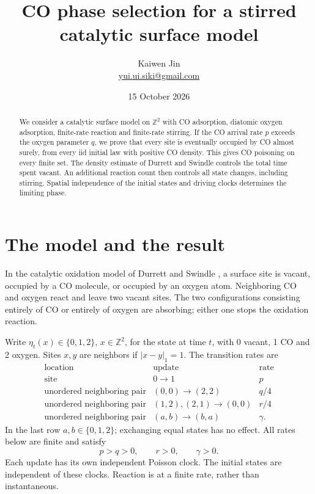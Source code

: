\documentclass[11pt,a4paper]{article}
\title{CO phase selection for a stirred catalytic surface model}
\author{Kaiwen Jin\\[3pt]
  \small\href{mailto:yui.ui.siki@gmail.com}{yui.ui.siki@gmail.com}}
\date{15 October 2026}
\newcommand{\Z}{\mathbb Z}
\begin{document}
\maketitle

\begin{abstract}
We consider a catalytic surface model on \(\Z^2\) with CO adsorption,
diatomic oxygen adsorption, finite-rate reaction and finite-rate stirring.
If the CO arrival rate \(p\) exceeds the oxygen parameter \(q\), we prove
that every site is eventually occupied by CO almost surely, from every
iid initial law with positive CO density. This gives CO poisoning on
every finite set. The density estimate of Durrett and Swindle controls
the total time spent vacant. An additional reaction count then controls
all state changes, including stirring. Spatial independence of the
initial states and driving clocks determines the limiting phase.
\end{abstract}

\section{The model and the result}

In the catalytic oxidation model of Durrett and Swindle \cite{DS}, a
surface site is vacant, occupied by a CO molecule, or occupied by an
oxygen atom. Neighboring CO and oxygen react and leave two vacant sites.
The two configurations consisting entirely of CO or entirely of oxygen
are absorbing; either one stops the oxidation reaction.

Write \(\eta_t(x)\in\{0,1,2\}\), \(x\in\Z^2\), for the state at time \(t\),
with 0 vacant, 1 CO and 2 oxygen. Sites \(x,y\) are neighbors if
\(|x-y|_1=1\). The transition rates are
\[
\begin{array}{c|c|c}
\text{location}&\text{update}&\text{rate}\\ \hline
\text{site}&0\longrightarrow1&p\\
\text{unordered neighboring pair}&(0,0)\longrightarrow(2,2)&q/4\\
\text{unordered neighboring pair}&(1,2),(2,1)\longrightarrow(0,0)&r/4\\
\text{unordered neighboring pair}&(a,b)\longrightarrow(b,a)&\gamma .
\end{array}
\]
In the last row \(a,b\in\{0,1,2\}\); exchanging equal states has no effect.
All rates below are finite and satisfy
\[
 p>q>0,\qquad r>0,\qquad \gamma>0.
\]
Each update has its own independent Poisson clock. The initial states are
independent of these clocks. Reaction is at a finite rate, rather than
instantaneous.
\end{document}
